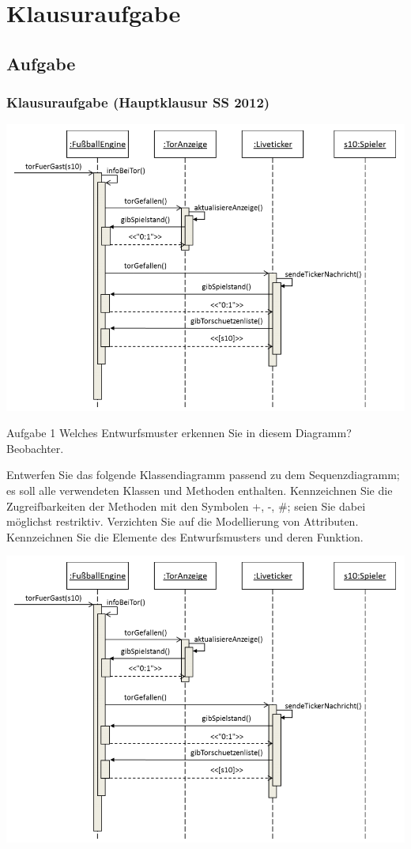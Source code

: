 \documentclass[18pt]{beamer}
\begin{document}
\section{Klausuraufgabe}
	\subsection{Aufgabe}
	\begin{frame}
		\frametitle{Klausuraufgabe (Hauptklausur SS 2012)}
		\includegraphics[scale=0.35]{./pics/tut3/obs-task.png}	
		\begin{block}{Aufgabe 1}
			Welches Entwurfsmuster erkennen Sie in diesem Diagramm? \pause
			Beobachter.
		\end{block}
	\end{frame}

	\begin{frame}
			\begin{small}
				Entwerfen Sie das folgende Klassendiagramm passend zu dem Sequenzdiagramm; es soll
				alle verwendeten Klassen und Methoden enthalten. Kennzeichnen Sie die Zugreifbarkeiten
				der Methoden mit den Symbolen +, -, \#; seien Sie dabei möglichst restriktiv. Verzichten
				Sie auf die Modellierung von Attributen. Kennzeichnen Sie die Elemente
				des Entwurfsmusters und deren Funktion.
			\end{small}
			\linebreak
			\includegraphics[scale=0.35]{./pics/tut3/obs-task.png}
	\end{frame}
\end{document}
